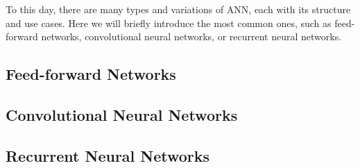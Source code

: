 
To this day, there are many types and variations of ANN, each with its structure and use cases.
Here we will briefly introduce the most common ones, such as feed-forward networks, convolutional neural networks, or recurrent neural networks.

\subsection{Feed-forward Networks}

\subsection{Convolutional Neural Networks}

\subsection{Recurrent Neural Networks}

